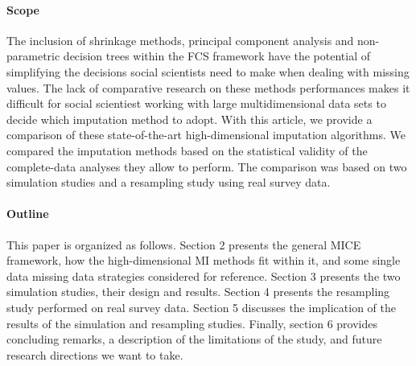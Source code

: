 \paragraph{Scope}
The inclusion of shrinkage methods, principal component analysis and non-parametric decision trees within the FCS framework 
have the potential of simplifying the decisions social scientists need to make when dealing with missing values.
The lack of comparative research on these methods performances makes it difficult for social scientiest working with large
multidimensional data sets to decide which imputation method to adopt.
With this article, we provide a comparison of these state-of-the-art high-dimensional imputation algorithms.
We compared the imputation methods based on the statistical validity of the complete-data analyses they allow to perform.
The comparison was based on two simulation studies and a resampling study using real survey data.
%
\paragraph{Outline}
This paper is organized as follows. 
Section 2 presents the general MICE framework, how the high-dimensional MI methods fit within it, and some
single data missing data strategies considered for reference.
Section 3 presents the two simulation studies, their design and results.
Section 4 presents the resampling study performed on real survey data.
Section 5 discusses the implication of the results of the simulation and resampling studies.
Finally, section 6 provides concluding remarks, a description of the limitations of the study, and  
future research directions we want to take.
